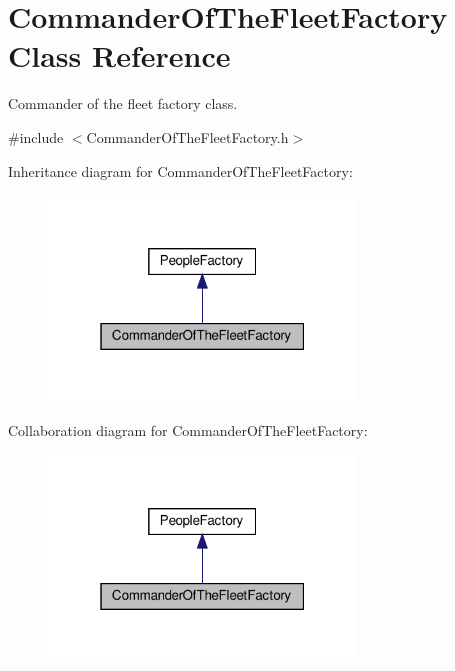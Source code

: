 \hypertarget{classCommanderOfTheFleetFactory}{}\section{Commander\+Of\+The\+Fleet\+Factory Class Reference}
\label{classCommanderOfTheFleetFactory}


Commander of the fleet factory class.  




{\ttfamily \#include $<$Commander\+Of\+The\+Fleet\+Factory.\+h$>$}



Inheritance diagram for Commander\+Of\+The\+Fleet\+Factory\+:\nopagebreak
\begin{figure}[H]
\begin{center}
\leavevmode
\includegraphics[width=232pt]{classCommanderOfTheFleetFactory__inherit__graph}
\end{center}
\end{figure}


Collaboration diagram for Commander\+Of\+The\+Fleet\+Factory\+:\nopagebreak
\begin{figure}[H]
\begin{center}
\leavevmode
\includegraphics[width=232pt]{classCommanderOfTheFleetFactory__coll__graph}
\end{center}
\end{figure}
